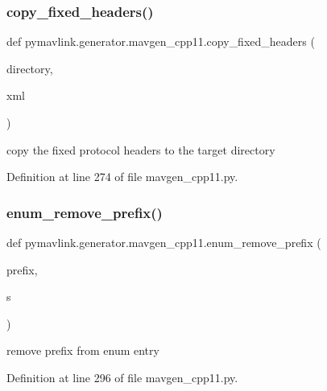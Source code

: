 \subsubsection{\texorpdfstring{copy\_fixed\_headers()}{copy\_fixed\_headers()}}
{\footnotesize\ttfamily def pymavlink.\+generator.\+mavgen\+\_\+cpp11.\+copy\+\_\+fixed\+\_\+headers (\begin{DoxyParamCaption}\item[{}]{directory,  }\item[{}]{xml }\end{DoxyParamCaption})}

\begin{DoxyVerb}copy the fixed protocol headers to the target directory\end{DoxyVerb}
 

Definition at line 274 of file mavgen\+\_\+cpp11.\+py.

\mbox{\label{namespacepymavlink_1_1generator_1_1mavgen__cpp11_a62a78fb03297e16426b20e29b0f97332}} 
\subsubsection{\texorpdfstring{enum\_remove\_prefix()}{enum\_remove\_prefix()}}
{\footnotesize\ttfamily def pymavlink.\+generator.\+mavgen\+\_\+cpp11.\+enum\+\_\+remove\+\_\+prefix (\begin{DoxyParamCaption}\item[{}]{prefix,  }\item[{}]{s }\end{DoxyParamCaption})}

\begin{DoxyVerb}remove prefix from enum entry\end{DoxyVerb}
 

Definition at line 296 of file mavgen\+\_\+cpp11.\+py.

\mbox{\label{namespacepymavlink_1_1generator_1_1mavgen__cpp11_a73fbdce6f04ff5bff120f5c0aca0effb}} 

